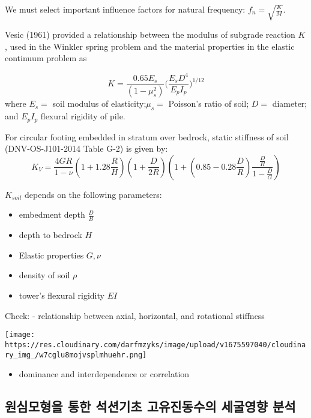 \documentclass[
  letterpaper,
  DIV=11,
  numbers=noendperiod]{scrreprt}
\providecommand{\tightlist}{%
  \setlength{\itemsep}{0pt}\setlength{\parskip}{0pt}}\usepackage{longtable,booktabs,array}
\begin{document}
We must select important influence factors for natural frequency:
\(f_n = \sqrt{\frac{K}{M}}\).

Vesic (1961) provided a relationship between the modulus of subgrade
reaction \(K\), used in the Winkler spring problem and the material
properties in the elastic continuum problem as

\[
K = \frac{0.65 E_s}{(1-\mu^2_s)} \big( \frac{E_s D^4}{E_p I_p} \big)^{1/12}
\] where \(E_s=\) soil modulus of elasticity;\(\mu_s=\) Poisson's ratio
of soil; \(D=\) diameter; and \(E_p I_p\) flexural rigidity of pile.

For circular footing embedded in stratum over bedrock, static stiffness
of soil (DNV-OS-J101-2014 Table G-2) is given by: \[
K_V = \frac{4GR}{1-\nu} (1+ 1.28 \frac{R}{H}) (1+ \frac{D}{2R}) (1+ (0.85  -0.28 \frac{D}{R})\frac{\frac{D}{H}}{1-\frac{D}{G}})
\]

\(K_{soil}\) depends on the following parameters:

\begin{itemize}
\tightlist
\item
  embedment depth \(\frac{D}{B}\)
\item
  depth to bedrock \(H\)
\item
  Elastic properties \(G, \nu\)
\item
  density of soil \(\rho\)
\item
  tower's flexural rigidity \(EI\)
\end{itemize}

Check: - relationship between axial, horizontal, and rotational
stiffness

\texttt{[image: https://res.cloudinary.com/darfmzyks/image/upload/v1675597040/cloudinary\_img\_/w7cglu8mojvsplmhuehr.png]}

\begin{itemize}
\tightlist
\item
  dominance and interdependence or correlation
\end{itemize}

\hypertarget{uxc6d0uxc2ecuxbaa8uxd615uxc744-uxd1b5uxd55c-uxc11duxc158uxae30uxcd08-uxace0uxc720uxc9c4uxb3d9uxc218uxc758-uxc138uxad74uxc601uxd5a5-uxbd84uxc11d}{%
\subsection{원심모형을 통한 석션기초 고유진동수의 세굴영향
분석}\label{uxc6d0uxc2ecuxbaa8uxd615uxc744-uxd1b5uxd55c-uxc11duxc158uxae30uxcd08-uxace0uxc720uxc9c4uxb3d9uxc218uxc758-uxc138uxad74uxc601uxd5a5-uxbd84uxc11d}}
\end{document}
